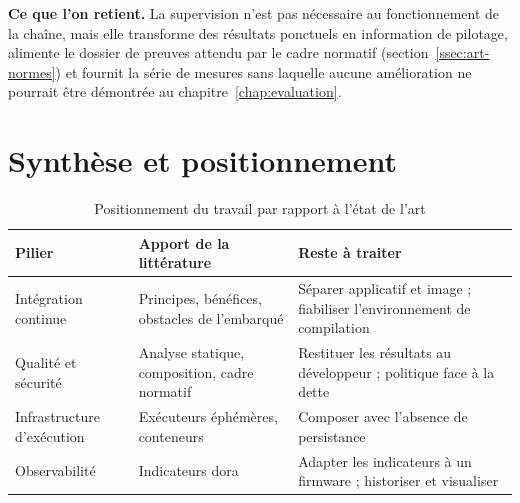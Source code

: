 \textbf{Ce que l'on retient.} La supervision n'est pas nécessaire au
fonctionnement de la chaîne, mais elle transforme des résultats ponctuels en
information de pilotage, alimente le dossier de preuves attendu par le cadre
normatif (section~\ref{ssec:art-normes}) et fournit la série de mesures sans
laquelle aucune amélioration ne pourrait être démontrée au
chapitre~\ref{chap:evaluation}.

\section{Synthèse et positionnement}
\label{sec:art-synthese}

\begin{table}[H]
\centering
\caption{Positionnement du travail par rapport à l'état de l'art}
\label{tab:art-positionnement}
\small
\begin{tabularx}{\textwidth}{@{}l X X@{}}
\toprule
\textbf{Pilier} & \textbf{Apport de la littérature} & \textbf{Reste à traiter} \\
\midrule
Intégration continue & Principes, bénéfices, obstacles de l'embarqué &
  Séparer applicatif et image ; fiabiliser l'environnement de compilation \\
Qualité et sécurité & Analyse statique, composition, cadre normatif &
  Restituer les résultats au développeur ; politique face à la dette \\
Infrastructure d'exécution & Exécuteurs éphémères, conteneurs &
  Composer avec l'absence de persistance \\
Observabilité & Indicateurs \gls{dora} &
  Adapter les indicateurs à un firmware ; historiser et visualiser \\
\bottomrule
\end{tabularx}
\end{table}
